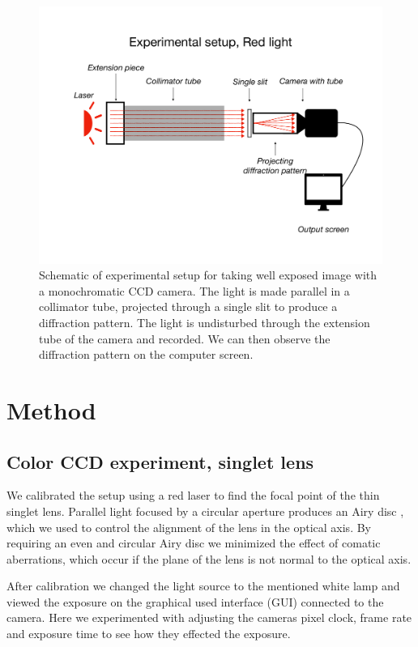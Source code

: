 \documentclass{emulateapj}
\begin{document}
\begin{figure}
	\centering
	\includegraphics[width=\linewidth]{./keynotes/exp_setup_red.pdf}
	\caption[Experimental setup red light]{Schematic of experimental setup for taking well exposed image with a monochromatic CCD camera. The light is made parallel in a collimator tube, projected through a single slit to produce a diffraction pattern. The light is undisturbed through the extension tube of the camera and recorded. We can then observe the diffraction pattern on the computer screen.}
	\label{fig: Setup red}
\end{figure}


\section{Method}
\label{sec:method}
\subsection{Color CCD experiment, singlet lens}
\label{subsec: Method/color CCD}
We calibrated the setup using a red laser to find the focal point of the thin singlet lens. Parallel light focused by a circular aperture produces an Airy disc \citep{lab1}, which we used to control the alignment of the lens in the optical axis. By requiring an even and circular Airy disc we minimized the effect of comatic aberrations, which occur if the plane of the lens is not normal to the optical axis.

After calibration we changed the light source to the mentioned white lamp and viewed the exposure on the graphical used interface (GUI) connected to the camera. Here we experimented with adjusting the cameras pixel clock, frame rate and exposure time to see how they effected the exposure.
\end{document}
